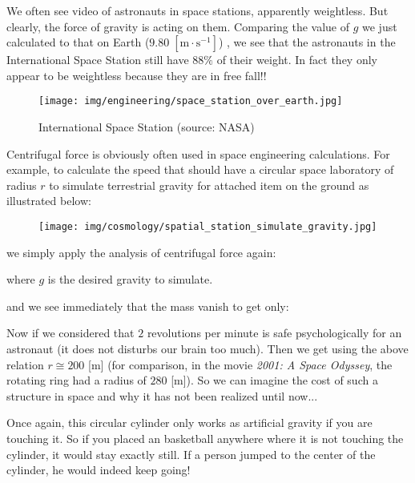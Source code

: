 	We often see video of astronauts in space stations, apparently weightless. But clearly, the force of gravity is acting
on them. Comparing the value of $g$ we just calculated to that on Earth ($9.80\;[\text{m}\cdot \text{s}^{-1}]$) , we see that the astronauts in the International Space Station still have $88\%$ of their weight. In fact they only appear to be weightless because they are in free fall!!
	\begin{figure}[H]
		\centering
		\texttt{[image: img/engineering/space\_station\_over\_earth.jpg]}
		\caption[International Space Station]{International Space Station (source: NASA)}
	\end{figure}
	Centrifugal force is obviously often used in space engineering calculations. For example, to calculate the speed that should have a circular space laboratory of radius $r$ to simulate terrestrial gravity for attached item on the ground as illustrated below:
	\begin{figure}[H]
		\centering
		\texttt{[image: img/cosmology/spatial\_station\_simulate\_gravity.jpg]}
	\end{figure}
	we simply apply the analysis of centrifugal force again:
	
	where $g$ is the desired gravity to simulate.
	
	and we see immediately that the mass vanish to get only:
	
	Now if we considered that $2$ revolutions per minute is safe psychologically for an astronaut (it does not disturbs our brain too much). Then we get using the above relation $r\cong 200$ [m] (for comparison, in the movie \textit{2001: A Space Odyssey}, the rotating ring had a radius of $280$ [m]). So we can imagine the cost of such a structure in space and why it has not been realized until now...
	
	Once again, this circular cylinder only works as artificial gravity if you are touching it. So if you placed an basketball anywhere where it is not touching the cylinder, it would stay exactly still. If a person jumped to the center of the cylinder, he would indeed keep going!

